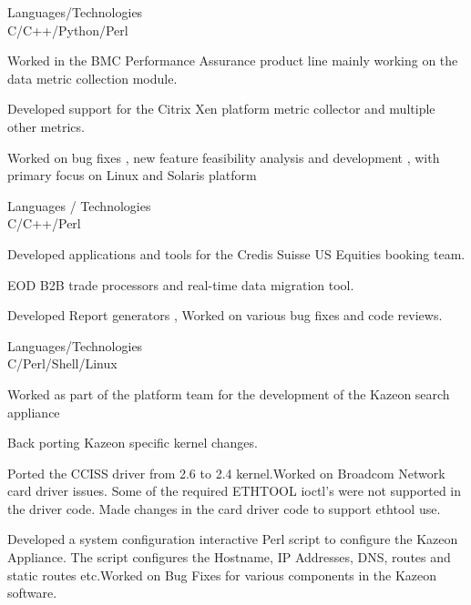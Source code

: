 \documentclass[a4,10pt]{cv4tw}
\begin{document}
{Languages/Technologies \\ C/C++/Python/Perl}
	{
	\begin{missions}
		\item Worked  in the BMC Performance Assurance product line mainly working on the data metric collection module.
		\item Developed support for the Citrix Xen platform metric collector and multiple other metrics.
		\item Worked  on bug fixes , new feature feasibility analysis and development , with primary focus on Linux and Solaris platform
	\end{missions}
}

{Languages / Technologies \\ C/C++/Perl}
	{
	\begin{missions}
		\item Developed applications and tools for the Credis Suisse US Equities booking team.
		\item EOD B2B trade processors and real-time data migration tool.
		\item Developed Report generators , Worked on various bug fixes and code reviews.
	\end{missions}
}

{Languages/Technologies \\ C/Perl/Shell/Linux}
	{
	\begin{missions}
		\item Worked as part of the platform team for the development of the Kazeon search appliance
		\item Back porting Kazeon specific kernel changes.
		\item Ported the CCISS driver from 2.6 to 2.4 kernel.Worked on Broadcom Network card driver issues. Some of the required ETHTOOL ioctl's were not supported in the driver code. Made changes in the card driver code to support ethtool use.
		\item Developed a  system configuration interactive Perl script to configure the Kazeon Appliance. The script configures the Hostname, IP Addresses, DNS, routes and static routes etc.Worked on Bug Fixes for various components in the Kazeon software.
	\end{missions}
}
\end{document}
